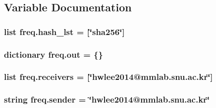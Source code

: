 \subsection{Variable Documentation}
\hypertarget{namespacefreq_a0c55ef62970b29c3431112c3f526866c}{
\subsubsection[{hash\-\_\-lst}]{\setlength{\rightskip}{0pt plus 5cm}list freq.\-hash\-\_\-lst = \mbox{[}\char`\"{}sha256\char`\"{}\mbox{]}}}\label{namespacefreq_a0c55ef62970b29c3431112c3f526866c}
\hypertarget{namespacefreq_a669a9e1968c9f172d4ef2fdb07389344}{
\subsubsection[{out}]{\setlength{\rightskip}{0pt plus 5cm}dictionary freq.\-out = \{\}}}\label{namespacefreq_a669a9e1968c9f172d4ef2fdb07389344}
\hypertarget{namespacefreq_a62efa438f460b688a9b7a448589b39db}{
\subsubsection[{receivers}]{\setlength{\rightskip}{0pt plus 5cm}list freq.\-receivers = \mbox{[}\char`\"{}hwlee2014@mmlab.\-snu.\-ac.\-kr\char`\"{}\mbox{]}}}\label{namespacefreq_a62efa438f460b688a9b7a448589b39db}
\hypertarget{namespacefreq_ab86364d24c362e07c325288107da8bef}{
\subsubsection[{sender}]{\setlength{\rightskip}{0pt plus 5cm}string freq.\-sender = \char`\"{}hwlee2014@mmlab.\-snu.\-ac.\-kr\char`\"{}}}\label{namespacefreq_ab86364d24c362e07c325288107da8bef}
